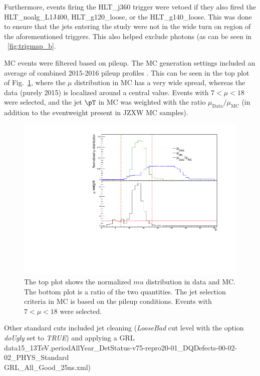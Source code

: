 Furthermore, events firing the HLT\_j360 trigger were vetoed if they also fired the HLT\_noalg\_L1J400, HLT\_g120\_loose, or the HLT\_g140\_loose. This was done to ensure that the jets entering the study were not in the wide turn on region of the aforementioned triggers. This also helped exclude photons (as can be seen in ~\ref{fig:trigmap_b}.


MC events were filtered based on pileup. The MC generation settings included an average of combined 2015-2016 pileup profiles \cite{twiki_MC15c}. This can be seen in the top plot of Fig.~\ref{fig:mu_weight}, where the $\mu$ distribution in MC has a very wide spread, whereas the data (purely 2015) is localized around a central value. Events with $7 < \mu < 18$ were selected, and the jet $\pT$ in MC was weighted with the ratio $\mu_{\mathrm{Data}}/\mu_{\mathrm{MC}}$ (in addition to the eventweight present in JZXW MC samples).



\begin{figure}
	\centering
	\includegraphics[width=1.0\textwidth]{figures/qualification/mu_weight.pdf}
	\caption{The top plot shows the normalized $mu$ distribution in data and MC. The bottom plot is a ratio of the two quantities. The jet selection criteria in MC is based on the pileup conditions. Events with $7 < \mu < 18$ were selected. }%
	\label{fig:mu_weight}%
\end{figure}

Other standard cuts included jet cleaning ({\it{LooseBad}} cut level with the option {\it{doUgly}} set to {\it TRUE}) and applying a GRL data15\_13TeV.periodAllYear\_DetStatus-v75-repro20-01\_DQDefects-00-02-02\_PHYS\_Standard\\GRL\_All\_Good\_25ns.xml)

